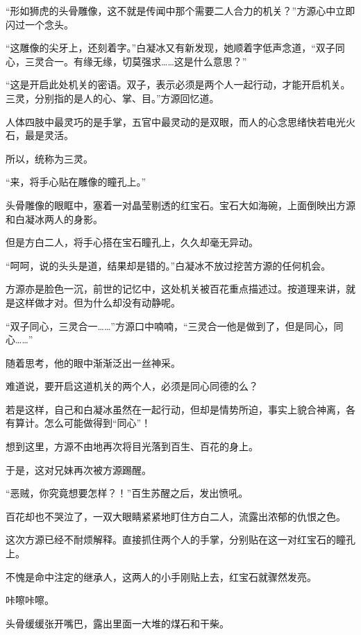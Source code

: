 
\begin{this_body}

“形如狮虎的头骨雕像，这不就是传闻中那个需要二人合力的机关？”方源心中立即闪过一个念头。

“这雕像的尖牙上，还刻着字。”白凝冰又有新发现，她顺着字低声念道，“双子同心，三灵合一。有缘无缘，切莫强求……这是什么意思？”

“这是开启此处机关的密语。双子，表示必须是两个人一起行动，才能开启机关。三灵，分别指的是人的心、掌、目。”方源回忆道。

人体四肢中最灵巧的是手掌，五官中最灵动的是双眼，而人的心念思绪快若电光火石，最是灵活。

所以，统称为三灵。

“来，将手心贴在雕像的瞳孔上。”

头骨雕像的眼眶中，塞着一对晶莹剔透的红宝石。宝石大如海碗，上面倒映出方源和白凝冰两人的身影。

但是方白二人，将手心搭在宝石瞳孔上，久久却毫无异动。

“呵呵，说的头头是道，结果却是错的。”白凝冰不放过挖苦方源的任何机会。

方源亦是脸色一沉，前世的记忆中，这处机关被百花重点描述过。按道理来讲，就是这样做才对。但为什么却没有动静呢。

“双子同心，三灵合一……”方源口中喃喃，“三灵合一他是做到了，但是同心，同心……”

随着思考，他的眼中渐渐泛出一丝神采。

难道说，要开启这道机关的两个人，必须是同心同德的么？

若是这样，自己和白凝冰虽然在一起行动，但却是情势所迫，事实上貌合神离，各有算计。怎么可能做得到“同心”！

想到这里，方源不由地再次将目光落到百生、百花的身上。

于是，这对兄妹再次被方源踢醒。

“恶贼，你究竟想要怎样？！”百生苏醒之后，发出愤吼。

百花却也不哭泣了，一双大眼睛紧紧地盯住方白二人，流露出浓郁的仇恨之色。

这次方源已经不耐烦解释。直接抓住两个人的手掌，分别贴在这一对红宝石的瞳孔上。

不愧是命中注定的继承人，这两人的小手刚贴上去，红宝石就骤然发亮。

咔嚓咔嚓。

头骨缓缓张开嘴巴，露出里面一大堆的煤石和干柴。


\end{this_body}
